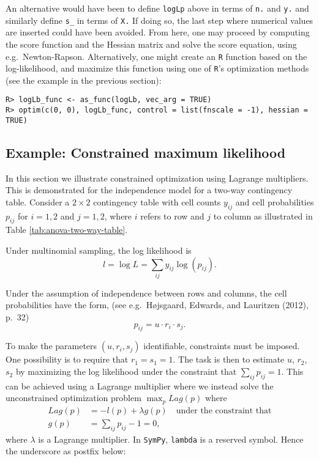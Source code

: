 An alternative would have been to define \texttt{logLp} above in terms of
\texttt{n.} and \texttt{y.} and similarly define \texttt{s\_} in terms of \texttt{X.} If doing so,
the last step where numerical values are inserted could have been
avoided. From here, one may proceed by computing the score function
and the Hessian matrix and solve the score equation, using
e.g.~Newton-Rapson. Alternatively, one might create an \texttt{R} function
based on the log-likelihood, and maximize this function using one of
\texttt{R}'s optimization methods (see the example in the previous section):

\begin{verbatim}
R> logLb_func <- as_func(logLb, vec_arg = TRUE)
R> optim(c(0, 0), logLb_func, control = list(fnscale = -1), hessian = TRUE)
\end{verbatim}

\hypertarget{example-constrained-maximum-likelihood}{%
\subsection{Example: Constrained maximum likelihood}\label{example-constrained-maximum-likelihood}}

In this section we illustrate constrained optimization using Lagrange multipliers.
This is demonstrated for the independence model for a two-way contingency table.
Consider a \(2 \times 2\) contingency table with cell
counts \(y_{ij}\) and cell probabilities \(p_{ij}\) for \(i=1,2\) and \(j=1,2\),
where \(i\) refers to row and \(j\) to column as
illustrated in Table \ref{tab:anova-two-way-table}.

Under multinomial sampling, the log likelihood is
\[
 l = \log L = \sum_{ij} y_{ij} \log(p_{ij}).
\]

Under the assumption of independence between rows and columns, the cell
probabilities have the form, (see e.g.~Højsgaard, Edwards, and Lauritzen (2012), p.~32)
\[
p_{ij}=u \cdot r_i \cdot s_j.
\]

To make the parameters \((u, r_i, s_j)\) identifiable, constraints
must be imposed. One possibility is to require that \(r_1=s_1=1\). The
task is then to estimate \(u\), \(r_2\), \(s_2\) by maximizing the log likelihood
under the constraint that \(\sum_{ij} p_{ij} = 1\). This can be
achieved using a Lagrange multiplier where we instead solve the
unconstrained optimization problem \(\max_p Lag(p)\) where
\begin{align}
  Lag(p) &= -l(p) + \lambda g(p) \quad \text{under the constraint that} \\
  g(p) &= \sum_{ij} p_{ij} - 1 = 0 ,
\end{align}
where \(\lambda\) is a Lagrange multiplier.
In \texttt{SymPy}, \texttt{lambda} is a reserved symbol. Hence the underscore as postfix below:

